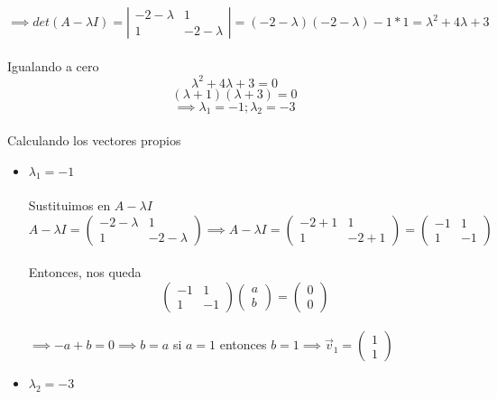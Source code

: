 $$\implies det(A - \lambda I) = \left|\begin{matrix}
-2- \lambda & 1\\
1 & -2- \lambda
\end{matrix} \right| = (-2- \lambda)(-2- \lambda) - 1*1 = \lambda ^2 + 4\lambda + 3$$
\\
Igualando a cero
$$\lambda ^2 + 4\lambda + 3 = 0$$
$$(\lambda + 1)(\lambda  + 3) = 0$$
$$\implies \lambda _1 = -1 ; \lambda _2 = -3$$
\\
Calculando los vectores propios
\begin{itemize}
    \item $\lambda _1 = -1$
            \\
            \\
            Sustituimos en $A - \lambda I$
            $$A - \lambda I = \begin{pmatrix}
            -2- \lambda & 1\\
            1 & -2- \lambda
            \end{pmatrix} \implies A - \lambda I = \begin{pmatrix}
            -2 + 1 & 1\\
            1 & -2 + 1
            \end{pmatrix} = \begin{pmatrix}
            -1 & 1\\
            1 & -1
            \end{pmatrix}$$
            \\
            Entonces, nos queda
            $$\begin{pmatrix}
            -1 & 1\\
            1 & -1
            \end{pmatrix}\begin{pmatrix}
            a\\
            b
            \end{pmatrix} = \begin{pmatrix}
            0\\
            0
            \end{pmatrix}$$
            \\
            $\implies -a + b = 0 \implies b = a$ si $a = 1$ entonces $b = 1 \implies \Vec{v}_1 = \begin{pmatrix}
            1\\
            1
            \end{pmatrix}$
        \item $\lambda _ 2 = -3$

\end{itemize}
